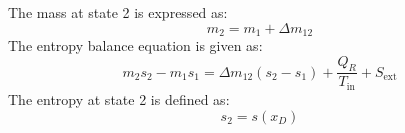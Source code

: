 The mass at state 2 is expressed as:  
\[
m_2 = m_1 + \Delta m_{12}
\]  
The entropy balance equation is given as:  
\[
m_2 s_2 - m_1 s_1 = \Delta m_{12} (s_2 - s_1) + \frac{Q_R}{T_{\text{in}}} + S_{\text{ext}}
\]  
The entropy at state 2 is defined as:  
\[
s_2 = s(x_D)
\]